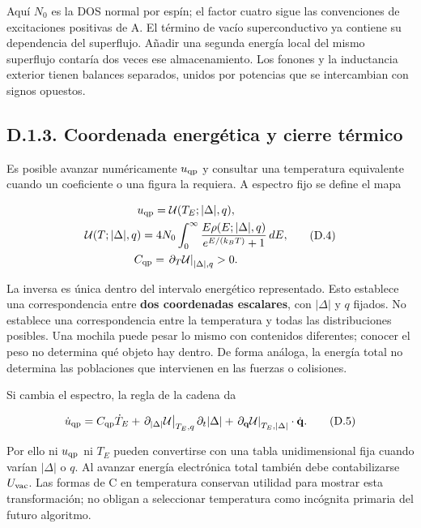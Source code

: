 \documentclass[
  spanish,
  10pt,
  a4paper,
]{article}
\newcounter{none} %
\begin{document}
Aquí \(N_0\) es la DOS normal por espín; el factor cuatro sigue las
convenciones de excitaciones positivas de A. El término de vacío
superconductivo ya contiene su dependencia del superflujo. Añadir una
segunda energía local del mismo superflujo contaría dos veces ese
almacenamiento. Los fonones y la inductancia exterior tienen balances
separados, unidos por potencias que se intercambian con signos opuestos.

\subsection{D.1.3. Coordenada energética y cierre
térmico}\label{d.1.3.-coordenada-energuxe9tica-y-cierre-tuxe9rmico}

Es posible avanzar numéricamente \(u_{\rm qp}\) y consultar una
temperatura equivalente cuando un coeficiente o una figura la requiera.
A espectro fijo se define el mapa

\[
\begin{gathered}
u_{\rm qp}=\mathcal U(T_E;|\Delta|,q),\\
\mathcal U(T;|\Delta|,q)=4N_0\int_0^\infty
\frac{E\rho(E;|\Delta|,q)}{e^{E/(k_BT)}+1}\,dE,\\
C_{\rm qp}=\left.\partial_T\mathcal U\right|_{|\Delta|,q}>0.
\end{gathered}\tag{D.4}
\]

La inversa es única dentro del intervalo energético representado. Esto
establece una correspondencia entre \textbf{dos coordenadas escalares},
con \(|\Delta|\) y \(q\) fijados. No establece una correspondencia entre
la temperatura y todas las distribuciones posibles. Una mochila puede
pesar lo mismo con contenidos diferentes; conocer el peso no determina
qué objeto hay dentro. De forma análoga, la energía total no determina
las poblaciones que intervienen en las fuerzas o colisiones.

Si cambia el espectro, la regla de la cadena da

\[
\dot u_{\rm qp}=C_{\rm qp}\dot T_E
+\left.\partial_{|\Delta|}\mathcal U\right|_{T_E,q}\partial_t|\Delta|
+\left.\partial_{\mathbf q}\mathcal U\right|_{T_E,|\Delta|}\cdot\dot{\mathbf q}.
\tag{D.5}
\]

Por ello ni \(u_{\rm qp}\) ni \(T_E\) pueden convertirse con una tabla
unidimensional fija cuando varían \(|\Delta|\) o \(q\). Al avanzar
energía electrónica total también debe contabilizarse \(U_{\rm vac}\).
Las formas de C en temperatura conservan utilidad para mostrar esta
transformación; no obligan a seleccionar temperatura como incógnita
primaria del futuro algoritmo.
\end{document}
